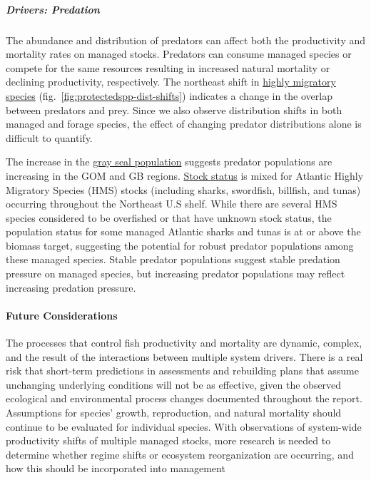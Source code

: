 \documentclass[
  10pt,
]{article}
\begin{document}
\hypertarget{drivers-predation}{%
\subparagraph{Drivers: Predation}\label{drivers-predation}}

The abundance and distribution of predators can affect both the productivity and mortality rates on managed stocks. Predators can consume managed species or compete for the same resources resulting in increased natural mortality or declining productivity, respectively. The northeast shift in \href{https://noaa-edab.github.io/catalog/cetacean-distribution-shifts.html}{highly migratory species} (fig.~\ref{fig:protectedspp-dist-shifts}) indicates a change in the overlap between predators and prey. Since we also observe distribution shifts in both managed and forage species, the effect of changing predator distributions alone is difficult to quantify.

The increase in the \href{https://noaa-edab.github.io/catalog/gray-seal-bycatch.html}{gray seal population} suggests predator populations are increasing in the GOM and GB regions. \href{https://noaa-edab.github.io/catalog/highly-migratory-species-stock-status.html}{Stock status} is mixed for Atlantic Highly Migratory Species (HMS) stocks (including sharks, swordfish, billfish, and tunas) occurring throughout the Northeast U.S shelf. While there are several HMS species considered to be overfished or that have unknown stock status, the population status for some managed Atlantic sharks and tunas is at or above the biomass target, suggesting the potential for robust predator populations among these managed species. Stable predator populations suggest stable predation pressure on managed species, but increasing predator populations may reflect increasing predation pressure.

\hypertarget{future-considerations-2}{%
\paragraph{Future Considerations}\label{future-considerations-2}}

The processes that control fish productivity and mortality are dynamic, complex, and the result of the interactions between multiple system drivers. There is a real risk that short-term predictions in assessments and rebuilding plans that assume unchanging underlying conditions will not be as effective, given the observed ecological and environmental process changes documented throughout the report. Assumptions for species' growth, reproduction, and natural mortality should continue to be evaluated for individual species. With observations of system-wide productivity shifts of multiple managed stocks, more research is needed to determine whether regime shifts or ecosystem reorganization are occurring, and how this should be incorporated into management
\end{document}
